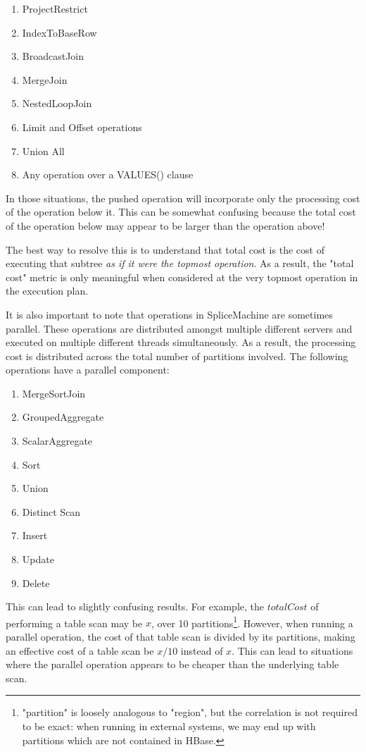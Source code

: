 \documentclass[10pt]{amsart}
\begin{document}
\begin{enumerate}
				\item ProjectRestrict
				\item IndexToBaseRow
				\item BroadcastJoin
				\item MergeJoin
				\item NestedLoopJoin 
				\item Limit and Offset operations
				\item Union All
				\item Any operation over a VALUES() clause
\end{enumerate}

In those situations,  the pushed operation will incorporate only the processing cost of the operation below it. This can be somewhat confusing because the total cost of the operation below may appear to be larger than the operation above!

The best way to resolve this is to understand that total cost is the cost of executing that subtree \emph{as if it were the topmost operation}. As a result, the "total cost" metric is only meaningful when considered at the very topmost operation in the execution plan.

It is also important to note that operations in SpliceMachine are sometimes parallel. These operations are distributed amongst multiple different servers and executed on multiple different threads simultaneously. As a result, the processing cost is distributed across the total number of partitions involved. The following operations have a parallel component:

\begin{enumerate}
\item	MergeSortJoin
\item GroupedAggregate
\item ScalarAggregate
\item Sort
\item Union
\item Distinct Scan
\item Insert
\item Update
\item Delete
\end{enumerate}

This can lead to slightly confusing results. For example, the $totalCost$ of performing a table scan may be $x$, over 10 partitions\footnote{"partition" is loosely analogous to "region", but the correlation is not required to be exact: when running in external systems, we may end up with partitions which are not contained in HBase.}. However, when running a parallel operation, the cost of that table scan is divided by its partitions, making an effective cost of a table scan be $x/10$ instead of $x$. This can lead to situations where the parallel operation appears to be cheaper than the underlying table scan.
\end{document}
